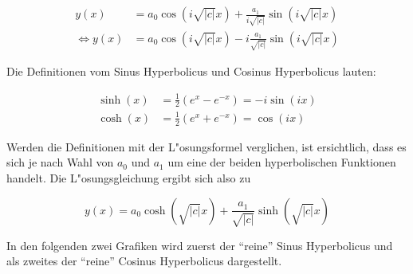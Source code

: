 \begin{equation}
	\begin{split}
	y(x) &= a_0 \cos(i\sqrt{|c|}x) + \frac{a_1}{i\sqrt{|c|}}\sin(i\sqrt{|c|}x) 
	\\
	\Leftrightarrow
	y(x) &= a_0 \cos(i\sqrt{|c|}x) - i\frac{a_1}{\sqrt{|c|}}\sin(i\sqrt{|c|}x)
	\end{split}	
	\label{eq:wellen:LSGnegcWerte}
\end{equation}

Die Definitionen vom Sinus Hyperbolicus und Cosinus Hyperbolicus lauten:

\begin{equation*}
	\begin{split}
	\sinh(x) &= \frac{1}{2} (e^x - e^{-x}) = -i \sin(ix)\\
	\cosh(x) &= \frac{1}{2} (e^x + e^{-x}) = \cos (ix)
	\end{split}
\end{equation*}

Werden die Definitionen mit der L"osungsformel verglichen, ist ersichtlich, 
dass es sich je nach Wahl von $a_0$ und $a_1$ um eine der beiden hyperbolischen 
Funktionen handelt. Die L"osungsgleichung ergibt sich also zu

\begin{equation}
	y(x) = a_0 \cosh(\sqrt{|c|}x) + \frac{a_1}{\sqrt{|c|}}\sinh(\sqrt{|c|}x)
	\label{eq:wellen:LSGhyperbolFunktion}
\end{equation}

In den folgenden zwei Grafiken wird zuerst der ``reine'' Sinus Hyperbolicus und 
als zweites der ``reine'' Cosinus Hyperbolicus dargestellt.

